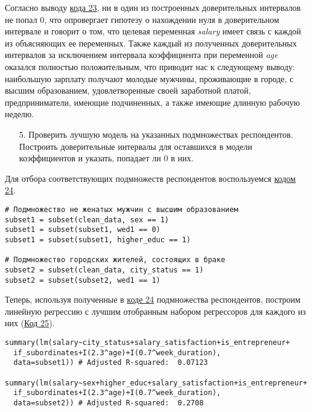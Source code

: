 Согласно выводу \hyperref[code:23]{кода 23}, ни в один из построенных доверительных интервалов не попал 0, что опровергает гипотезу о нахождении нуля в доверительном интервале и говорит о том, что целевая переменная \textit{salary} имеет связь с каждой из объясняющих ее переменных.
Также каждый из полученных доверительных интервалов за исключением интервала коэффициента при переменной \textit{age} оказался полностью положительным, что приводит нас к следующему выводу: наибольшую зарплату получают молодые мужчины, проживающие в городе, с высшим образованием, удовлетворенные своей заработной платой, предприниматели, имеющие подчиненных, а также имеющие длинную рабочую неделю.

\begin{enumerate}
    \item[5.] Проверить лучшую модель на указанных подмножествах респондентов. Построить доверительные интервалы для оставшихся в модели коэффициентов и указать, попадает ли 0 в них.
\end{enumerate}

Для отбора соответствующих подмножеств респондентов воспользуемся \hyperref[code:24]{кодом 24}.

\begin{code}
\begin{verbatim}
# Подмножество не женатых мужчин с высшим образованием
subset1 = subset(clean_data, sex == 1)
subset1 = subset(subset1, wed1 == 0)
subset1 = subset(subset1, higher_educ == 1)

# Подмножество городских жителей, состоящих в браке
subset2 = subset(clean_data, city_status == 1)
subset2 = subset(subset2, wed1 == 1)
\end{verbatim}
\label{code:24}
\end{code}

Теперь, используя полученные в \hyperref[code:24]{коде 24} подмножества респондентов, построим линейную регрессию с лучшим отобранным набором регрессоров для каждого из них (\hyperref[code:25]{Код 25}).

\begin{code}
\begin{verbatim}
summary(lm(salary~city_status+salary_satisfaction+is_entrepreneur+
  if_subordinates+I(2.3^age)+I(0.7^week_duration),
  data=subset1)) # Adjusted R-squared:  0.07123

summary(lm(salary~sex+higher_educ+salary_satisfaction+is_entrepreneur+
  if_subordinates+I(2.3^age)+I(0.7^week_duration),
  data=subset2)) # Adjusted R-squared:  0.2708
\end{verbatim}
\label{code:25}
\end{code}

